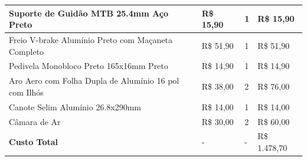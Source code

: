\begin{table}[!htbp]
\begin{center}
{\begin{tabular}{|p{8cm}|p{2cm}|p{}|p{}|}
					Suporte de Guidão MTB 25.4mm Aço Preto & R\$ 15,90 & 1 & R\$ 15,90 \\\hline
					Freio V-brake Alumínio Preto com Maçaneta Completo & R\$ 51,90 & 1 & R\$ 51,90 \\\hline
					Pedivela Monobloco Preto 165x16mm Preto & R\$ 14,90 & 1 & R\$ 14,90 \\\hline
					Aro Aero com Folha Dupla de Alumínio 16 pol com Ilhós & R\$ 38,00 & 2 & R\$ 76,00 \\\hline
					Canote Selim Alumínio 26.8x290mm & R\$ 14,00 & 1 & R\$ 14,00 \\\hline
					Câmara de Ar & R\$ 30,00 & 2 & R\$ 60,00 \\\hline\hline
					\textbf{Custo Total} & - & - & R\$ 1.478,70 \\\hline
				\end{tabular}
			}
		\end{center}
	\end{table}